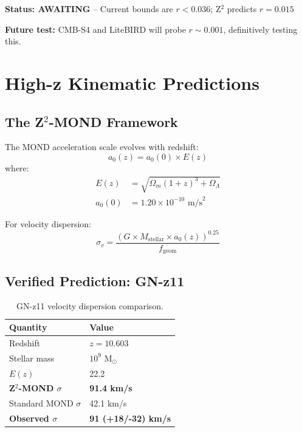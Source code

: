 \documentclass[12pt,a4paper]{article}
\begin{document}
\textbf{Status: AWAITING} -- Current bounds are $r < 0.036$; Z$^2$ predicts $r = 0.015$

\textbf{Future test:} CMB-S4 and LiteBIRD will probe $r \sim 0.001$, definitively testing this.

\section{High-z Kinematic Predictions}

\subsection{The Z$^2$-MOND Framework}

The MOND acceleration scale evolves with redshift:
\begin{equation}
a_0(z) = a_0(0) \times E(z)
\end{equation}
where:
\begin{align}
E(z) &= \sqrt{\Omega_m(1+z)^3 + \Omega_\Lambda} \\
a_0(0) &= 1.20 \times 10^{-10} \text{ m/s}^2
\end{align}

For velocity dispersion:
\begin{equation}
\sigma_v = \frac{(G \times M_{\text{stellar}} \times a_0(z))^{0.25}}{f_{\text{geom}}}
\end{equation}

\subsection{Verified Prediction: GN-z11}

\begin{table}[h]
\centering
\begin{tabular}{@{}ll@{}}
\toprule
Quantity & Value \\
\midrule
Redshift & $z = 10.603$ \\
Stellar mass & $10^9$ M$_\odot$ \\
$E(z)$ & 22.2 \\
\textbf{Z$^2$-MOND $\sigma$} & \textbf{91.4 km/s} \\
Standard MOND $\sigma$ & 42.1 km/s \\
\textbf{Observed $\sigma$} & \textbf{91 (+18/-32) km/s} \\
\bottomrule
\end{tabular}
\caption{GN-z11 velocity dispersion comparison.}
\end{table}
\end{document}
